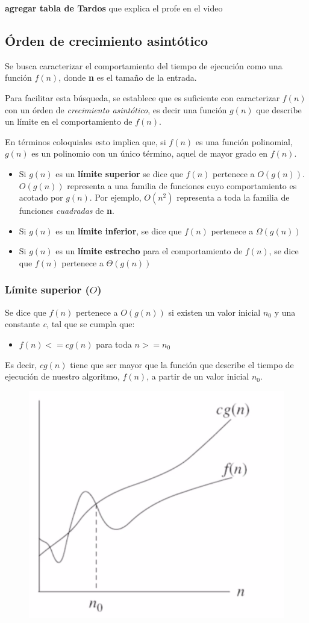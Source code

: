 \documentclass[letterpaper]{article}
\begin{document}
\textbf{agregar tabla de Tardos} que explica el profe en el video
\subsection{Órden de crecimiento asintótico}
\label{sec:org8b4eab2}
Se busca caracterizar el comportamiento del tiempo de ejecución como una función
\(f(n)\), donde \textbf{n} es el tamaño de la entrada.

Para facilitar esta búsqueda, se establece que es suficiente con caracterizar
\(f(n)\) con un órden de \emph{crecimiento asintótico}, es decir una función \(g(n)\) que
describe un límite en el comportamiento de \(f(n)\).

En términos coloquiales esto implica que, si \(f(n)\) es una función polinomial,
\(g(n)\) es un polinomio con un único término, aquel de mayor grado en \(f(n)\).
\begin{itemize}
\item Si \(g(n)\) es un \textbf{límite superior} se dice que \(f(n)\) pertenece a \(O(g(n))\).
\(O(g(n))\) representa a una familia de funciones cuyo comportamiento es acotado
por \(g(n)\).
Por ejemplo, \(O(n^2)\) representa a toda la familia de funciones \emph{cuadradas}
de \textbf{n}.
\item Si \(g(n)\) es un \textbf{límite inferior}, se dice que \(f(n)\) pertenece a \(\Omega(g(n))\)
\item Si \(g(n)\) es un \textbf{límite estrecho} para el comportamiento de \(f(n)\), se dice
que \(f(n)\) pertenece a \(\Theta(g(n))\)
\end{itemize}
\subsubsection{Límite superior (\(O\))}
\label{sec:orge590ccb}
Se dice que \(f(n)\) pertenece a \(O(g(n))\) si existen un valor inicial \(n_0\) y una
constante \emph{c}, tal que se cumpla que:
\begin{itemize}
\item \(f(n) <= c g(n)\) para toda \(n >= n_0\)
\end{itemize}

Es decir, \(c g(n)\) tiene que ser mayor que la función que describe el tiempo de
ejecución de nuestro algoritmo, \(f(n)\), a partir de un valor inicial \(n_0\).

\begin{figure}
    \includegraphics[widht=0.7\textwidth, height=0.4\textwidth]
        {./img/limite_superior.png}
\end{figure}
\end{document}

